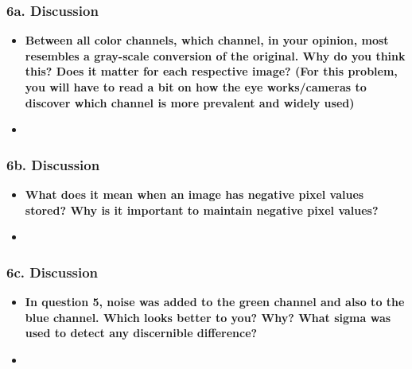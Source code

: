 \documentclass[../report.tex]{subfiles}
\begin{document}
    
    \begin{frame}[t]
        \frametitle{6a. Discussion}
        \begin{normalsize}
            \begin{itemize}
                \setlength\itemsep{1em}\fontsize{6pt}{6pt}
                
                \item[]{\textbf{Between all color channels, which channel, in your opinion, most resembles a gray-scale conversion of the original.  Why do you think this?  Does it matter for each respective image? (For this problem, you will have to read a bit on how the eye works/cameras to discover which channel is more prevalent and widely used)} }
                
                \item[]{\selectfont\textcolor{blue}{}}
                
            \end{itemize}
        \end{normalsize}
    \end{frame}

    \begin{frame}[t]
        \frametitle{6b. Discussion}
        \begin{normalsize}
            \begin{itemize}
                \setlength\itemsep{1em}\fontsize{6pt}{6pt}
                
                \item[]\textbf{What does it mean when an image has negative pixel values stored?  Why is it important to maintain negative pixel values?}
                
                \item[]{\selectfont\textcolor{blue}{}}
                
            \end{itemize}
        \end{normalsize}
    \end{frame}

    \begin{frame}[t]
        \frametitle{6c. Discussion}
        \begin{normalsize}
            \begin{itemize}
                \setlength\itemsep{1em}\fontsize{6pt}{6pt}
                
                \item[]\textbf{In question 5, noise was added to the green channel and also to the blue channel. Which looks better to you? Why? What sigma was used to detect any discernible difference?}
                
                \item[]{\selectfont\textcolor{blue}{}}
                
            \end{itemize}
        \end{normalsize}
    \end{frame}
    
\end{document}
